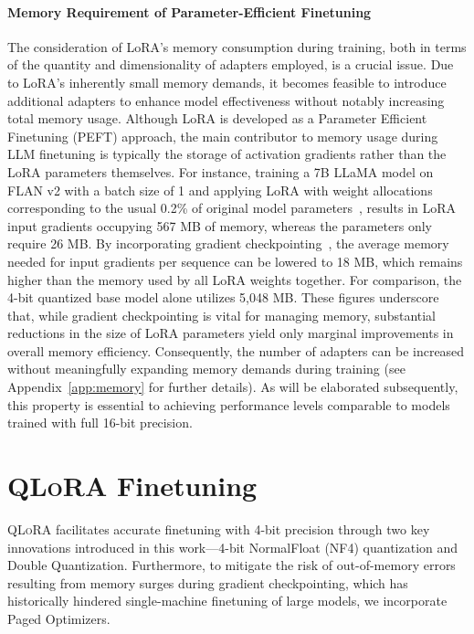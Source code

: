 \paragraph{Memory Requirement of Parameter-Efficient Finetuning} The consideration of LoRA’s memory consumption during training, both in terms of the quantity and dimensionality of adapters employed, is a crucial issue. Due to LoRA's inherently small memory demands, it becomes feasible to introduce additional adapters to enhance model effectiveness without notably increasing total memory usage. Although LoRA is developed as a Parameter Efficient Finetuning (PEFT) approach, the main contributor to memory usage during LLM finetuning is typically the storage of activation gradients rather than the LoRA parameters themselves. For instance, training a 7B LLaMA model on FLAN v2 with a batch size of 1 and applying LoRA with weight allocations corresponding to the usual 0.2\% of original model parameters~\citep{hu2021lora,liu2022few}, results in LoRA input gradients occupying 567 MB of memory, whereas the parameters only require 26 MB. By incorporating gradient checkpointing~\citep{chen2016training}, the average memory needed for input gradients per sequence can be lowered to 18 MB, which remains higher than the memory used by all LoRA weights together. For comparison, the 4-bit quantized base model alone utilizes 5,048 MB. These figures underscore that, while gradient checkpointing is vital for managing memory, substantial reductions in the size of LoRA parameters yield only marginal improvements in overall memory efficiency. Consequently, the number of adapters can be increased without meaningfully expanding memory demands during training (see Appendix~\ref{app:memory} for further details). As will be elaborated subsequently, this property is essential to achieving performance levels comparable to models trained with full 16-bit precision.

\section{\textsc{QLoRA} Finetuning}

\textsc{QLoRA} facilitates accurate finetuning with 4-bit precision through two key innovations introduced in this work—4-bit NormalFloat (NF4) quantization and Double Quantization. Furthermore, to mitigate the risk of out-of-memory errors resulting from memory surges during gradient checkpointing, which has historically hindered single-machine finetuning of large models, we incorporate Paged Optimizers.

